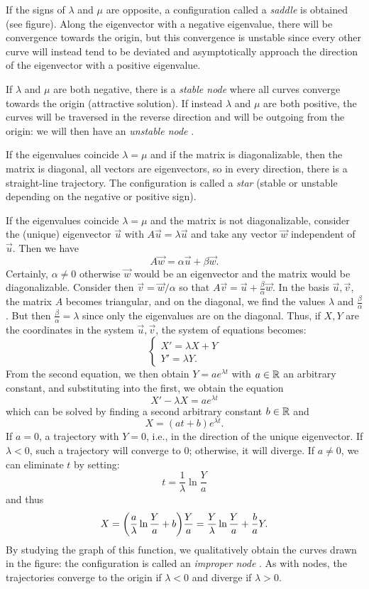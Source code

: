 If the signs of $\lambda$ and $\mu$ are opposite, a configuration called a
\emph{saddle}%
 is obtained (see figure). Along the eigenvector with a negative eigenvalue, there will be convergence towards the origin, but this convergence is unstable since every other curve will instead tend to be deviated and asymptotically approach the direction of the eigenvector with a positive eigenvalue.

If $\lambda$ and $\mu$ are both negative, there is a \emph{stable node}%
 where all curves converge towards the origin (attractive solution). If instead $\lambda$ and $\mu$ are both positive, the curves will be traversed in the reverse direction and will be outgoing from the origin: we will then have an \emph{unstable node}%
.

If the eigenvalues coincide $\lambda=\mu$ and if the matrix is diagonalizable,
then the matrix is diagonal, all vectors are eigenvectors, so in every
direction, there is a straight-line trajectory. The configuration is called a
\emph{star}%
 (stable or unstable depending on the negative or positive sign).

If the eigenvalues coincide $\lambda = \mu$ and the matrix is not
diagonalizable, consider the (unique) eigenvector $\vec u$ with $A \vec u =
\lambda \vec u$ and take any vector $\vec w$ independent of $\vec u$. Then we
have
\[
  A \vec w = \alpha \vec u + \beta \vec w.
\]
Certainly, $\alpha \neq 0$ otherwise $\vec w$ would be an eigenvector and the
matrix would be diagonalizable. Consider then $\vec v = \vec w / \alpha$ so that
$A \vec v = \vec u + \frac{\beta}{\alpha} \vec w$. In the basis $\vec u, \vec
v$, the matrix $A$ becomes triangular, and on the diagonal, we find the values
$\lambda$ and $\frac{\beta}{\alpha}$. But then $\frac{\beta}{\alpha} = \lambda$
since only the eigenvalues are on the diagonal. Thus, if $X,Y$ are the
coordinates in the system $\vec u, \vec v$, the system of equations becomes:
\[
\begin{cases}
X' = \lambda X + Y \\
Y' = \lambda Y.
\end{cases}
\]
From the second equation, we then obtain $Y = a e^{\lambda t}$ with $a\in {\mathbb R}$
an arbitrary constant, and substituting into the first, we obtain the equation
\[
  X' - \lambda X = a e^{\lambda t}
\]
which can be solved by finding a second arbitrary constant $b\in {\mathbb R}$ and
\[
  X = (at+b) e^{\lambda t}.
\]
If $a=0$, a trajectory with $Y=0$, i.e., in the direction of the unique
eigenvector. If $\lambda <0$, such a trajectory will converge to $0$; otherwise,
it will diverge. If $a\neq 0$, we can eliminate $t$ by setting:
\[
  t = \frac 1 \lambda \ln \frac{Y}{a}
\]
and thus
\[
  X = {\left( \frac{a}{\lambda} \ln \frac{Y}{a}+ b \right)} \frac{Y}{a}
  =  \frac{Y}{\lambda}\ln \frac{Y}{a}+ \frac{b}{a}Y.
\]
By studying the graph of this function, we qualitatively obtain the curves drawn
in the figure: the configuration is called an \emph{improper node}%
. As with nodes, the trajectories converge to the origin if $\lambda < 0$ and diverge if $\lambda >0$.

